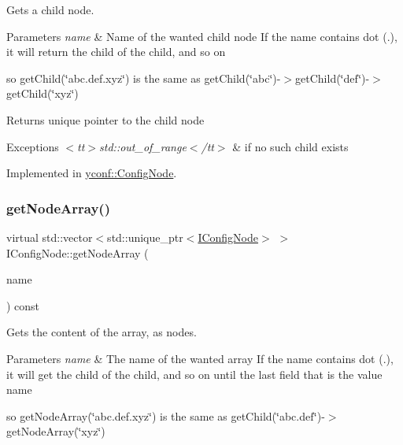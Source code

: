 Gets a child node. 


\begin{DoxyParams}{Parameters}
{\em name} & Name of the wanted child node If the name contains dot ({\ttfamily .}), it will return the child of the child, and so on\\
\hline
\end{DoxyParams}
so {\ttfamily get\+Child(\char`\"{}abc.\+def.\+xyz\char`\"{})} is the same as {\ttfamily get\+Child(\char`\"{}abc\char`\"{})-\/$>$get\+Child(\char`\"{}def\char`\"{})-\/$>$get\+Child(\char`\"{}xyz\char`\"{})}

\begin{DoxyReturn}{Returns}
unique pointer to the child node 
\end{DoxyReturn}

\begin{DoxyExceptions}{Exceptions}
{\em $<$tt$>$std\+::out\+\_\+of\+\_\+range$<$/tt$>$} & if no such child exists \\
\hline
\end{DoxyExceptions}


Implemented in \hyperlink{classyconf_1_1ConfigNode_a419f3e4e042f7cd0746f83d96977d18e}{yconf\+::\+Config\+Node}.

\mbox{\label{classIConfigNode_a3a15562e0598f5bb105ddd006e298157}} 
\subsubsection{\texorpdfstring{get\+Node\+Array()}{getNodeArray()}}
{\footnotesize\ttfamily virtual std\+::vector$<$std\+::unique\+\_\+ptr$<$\hyperlink{classIConfigNode}{I\+Config\+Node}$>$ $>$ I\+Config\+Node\+::get\+Node\+Array (\begin{DoxyParamCaption}\item[{const std\+::string \&}]{name }\end{DoxyParamCaption}) const\hspace{0.3cm}{\ttfamily [pure virtual]}}



Gets the content of the array, as nodes. 


\begin{DoxyParams}{Parameters}
{\em name} & The name of the wanted array If the name contains dot ({\ttfamily .}), it will get the child of the child, and so on until the last field that is the value name\\
\hline
\end{DoxyParams}
so {\ttfamily get\+Node\+Array(\char`\"{}abc.\+def.\+xyz\char`\"{})} is the same as {\ttfamily get\+Child(\char`\"{}abc.\+def\char`\"{})-\/$>$get\+Node\+Array(\char`\"{}xyz\char`\"{})}

